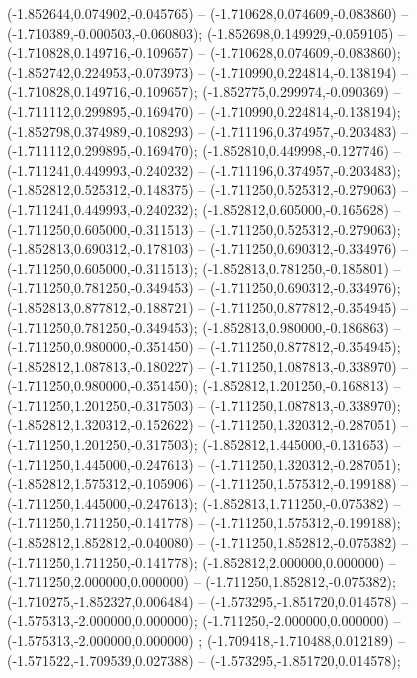  (-1.852644,0.074902,-0.045765) -- (-1.710628,0.074609,-0.083860) -- (-1.710389,-0.000503,-0.060803);
 (-1.852698,0.149929,-0.059105) -- (-1.710828,0.149716,-0.109657) -- (-1.710628,0.074609,-0.083860);
 (-1.852742,0.224953,-0.073973) -- (-1.710990,0.224814,-0.138194) -- (-1.710828,0.149716,-0.109657);
 (-1.852775,0.299974,-0.090369) -- (-1.711112,0.299895,-0.169470) -- (-1.710990,0.224814,-0.138194);
 (-1.852798,0.374989,-0.108293) -- (-1.711196,0.374957,-0.203483) -- (-1.711112,0.299895,-0.169470);
 (-1.852810,0.449998,-0.127746) -- (-1.711241,0.449993,-0.240232) -- (-1.711196,0.374957,-0.203483);
 (-1.852812,0.525312,-0.148375) -- (-1.711250,0.525312,-0.279063) -- (-1.711241,0.449993,-0.240232);
 (-1.852812,0.605000,-0.165628) -- (-1.711250,0.605000,-0.311513) -- (-1.711250,0.525312,-0.279063);
 (-1.852813,0.690312,-0.178103) -- (-1.711250,0.690312,-0.334976) -- (-1.711250,0.605000,-0.311513);
 (-1.852813,0.781250,-0.185801) -- (-1.711250,0.781250,-0.349453) -- (-1.711250,0.690312,-0.334976);
 (-1.852813,0.877812,-0.188721) -- (-1.711250,0.877812,-0.354945) -- (-1.711250,0.781250,-0.349453);
 (-1.852813,0.980000,-0.186863) -- (-1.711250,0.980000,-0.351450) -- (-1.711250,0.877812,-0.354945);
 (-1.852812,1.087813,-0.180227) -- (-1.711250,1.087813,-0.338970) -- (-1.711250,0.980000,-0.351450);
 (-1.852812,1.201250,-0.168813) -- (-1.711250,1.201250,-0.317503) -- (-1.711250,1.087813,-0.338970);
 (-1.852812,1.320312,-0.152622) -- (-1.711250,1.320312,-0.287051) -- (-1.711250,1.201250,-0.317503);
 (-1.852812,1.445000,-0.131653) -- (-1.711250,1.445000,-0.247613) -- (-1.711250,1.320312,-0.287051);
 (-1.852812,1.575312,-0.105906) -- (-1.711250,1.575312,-0.199188) -- (-1.711250,1.445000,-0.247613);
 (-1.852813,1.711250,-0.075382) -- (-1.711250,1.711250,-0.141778) -- (-1.711250,1.575312,-0.199188);
 (-1.852812,1.852812,-0.040080) -- (-1.711250,1.852812,-0.075382) -- (-1.711250,1.711250,-0.141778);
 (-1.852812,2.000000,0.000000) -- (-1.711250,2.000000,0.000000) -- (-1.711250,1.852812,-0.075382);
 (-1.710275,-1.852327,0.006484) -- (-1.573295,-1.851720,0.014578) -- (-1.575313,-2.000000,0.000000);
 (-1.711250,-2.000000,0.000000) -- (-1.575313,-2.000000,0.000000) ;
 (-1.709418,-1.710488,0.012189) -- (-1.571522,-1.709539,0.027388) -- (-1.573295,-1.851720,0.014578);
